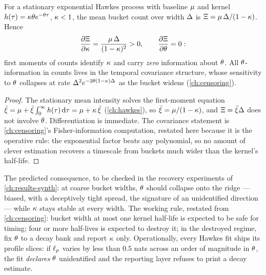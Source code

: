\begin{proposition}\label{prop:ch07:ridge}
For a stationary exponential Hawkes process with baseline $\mu$ and
kernel $h(\tau)=\kappa\theta e^{-\theta\tau}$, $\kappa<1$, the
mean bucket count over width $\Delta$ is
$\Xi = \mu\,\Delta/(1-\kappa)$. Hence
\[
\frac{\partial \Xi}{\partial\kappa}
 = \frac{\mu\,\Delta}{(1-\kappa)^2} > 0,
\qquad
\frac{\partial \Xi}{\partial\theta} = 0 :
\]
first moments of counts identify $\kappa$ and carry \emph{zero}
information about $\theta$. All $\theta$-information in counts lives in
the temporal covariance structure, whose sensitivity to $\theta$
collapses at rate $\Delta^2 e^{-2\theta(1-\kappa)\Delta}$ as the
bucket widens (\cref{ch:censoring}).
\end{proposition}

\begin{proof}
The stationary mean intensity solves the first-moment equation
$\bar\xi = \mu + \bar\xi\int_0^\infty h(\tau)\,\mathrm{d}\tau
 = \mu + \kappa\,\bar\xi$ (\cref{ch:hawkes}), so
$\bar\xi = \mu/(1-\kappa)$, and $\Xi = \bar\xi\Delta$ does not
involve $\theta$. Differentiation is immediate. The covariance statement
is \cref{ch:censoring}'s Fisher-information computation, restated here
because it is the operative rule: the exponential factor beats any
polynomial, so no amount of clever estimation recovers a timescale from
buckets much wider than the kernel's half-life.
\end{proof}

The predicted consequence, to be checked in the recovery experiments of
\cref{ch:results-synth}: at coarse bucket widths, $\theta$ should collapse
onto the ridge --- biased, with a deceptively tight spread, the signature
of an unidentified direction --- while $\kappa$ stays stable at every
width. The working rule, restated from \cref{ch:censoring}: bucket width
at most one kernel half-life is expected to be safe for timing; four or
more half-lives is expected to destroy it; in the destroyed regime, fix
$\theta$ to a decay bank and report
$\kappa$ only. Operationally, every Hawkes fit ships its profile slices:
if $\ell_p$ varies by less than $0.5$ nats across an order of
magnitude in $\theta$, the fit \emph{declares} $\theta$ unidentified and
the reporting layer refuses to print a decay estimate.

